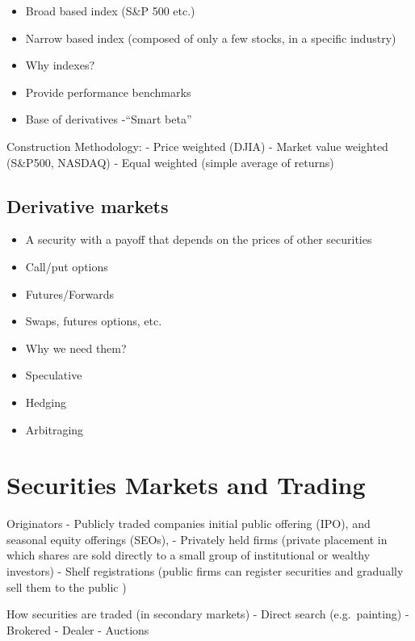 \documentclass[
]{book}
\providecommand{\tightlist}{%
  \setlength{\itemsep}{0pt}\setlength{\parskip}{0pt}}
\begin{document}
\begin{itemize}
\item
  Broad based index (S\&P 500 etc.)
\item
  Narrow based index (composed of only a few stocks, in a specific industry)
\item
  Why indexes?
\item
  Provide performance benchmarks
\item
  Base of derivatives
  -``Smart beta''
\end{itemize}

Construction Methodology:
- Price weighted (DJIA)
- Market value weighted (S\&P500, NASDAQ)
- Equal weighted (simple average of returns)

\hypertarget{derivative-markets}{%
\subsection{Derivative markets}\label{derivative-markets}}

\begin{itemize}
\tightlist
\item
  A security with a payoff that depends on the prices of other securities
\item
  Call/put options
\item
  Futures/Forwards
\item
  Swaps, futures options, etc.
\item
  Why we need them?
\item
  Speculative
\item
  Hedging
\item
  Arbitraging
\end{itemize}

\hypertarget{securities-markets-and-trading}{%
\section{Securities Markets and Trading}\label{securities-markets-and-trading}}

Originators
- Publicly traded companies initial public offering (IPO), and seasonal equity offerings (SEOs), - Privately held firms (private placement in which shares are sold directly to
a small group of institutional or wealthy investors)
- Shelf registrations (public firms can register securities and gradually sell them to the public )

How securities are traded (in secondary markets)
- Direct search (e.g.~painting)
- Brokered
- Dealer
- Auctions
\end{document}
